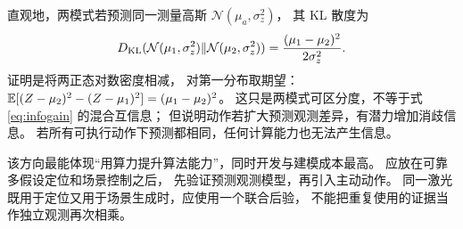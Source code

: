 直观地，两模式若预测同一测量高斯
$\mathcal N(\mu_a,\sigma_z^2)$，
其 KL 散度为
\[
D_{\rm KL}(\mathcal N(\mu_1,\sigma_z^2)\|
\mathcal N(\mu_2,\sigma_z^2))
=\frac{(\mu_1-\mu_2)^2}{2\sigma_z^2}.
\]
证明是将两正态对数密度相减，
对第一分布取期望：
$\mathbb E[(Z-\mu_2)^2-(Z-\mu_1)^2]=(\mu_1-\mu_2)^2$。
这只是两模式可区分度，不等于式 \eqref{eq:infogain} 的混合互信息；
但说明动作若扩大预测观测差异，有潜力增加消歧信息。
若所有可执行动作下预测都相同，任何计算能力也无法产生信息。

该方向最能体现“用算力提升算法能力”，同时开发与建模成本最高。
应放在可靠多假设定位和场景控制之后，
先验证预测观测模型，再引入主动动作。
同一激光既用于定位又用于场景生成时，应使用一个联合后验，
不能把重复使用的证据当作独立观测再次相乘。
